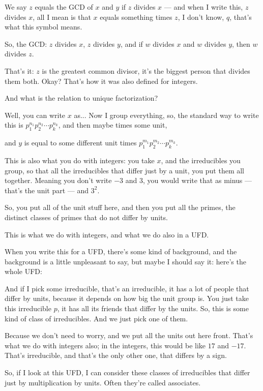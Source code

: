 \begin{speech}[01:18:14 - 01:21:04]
We say $z$ equals the GCD of $x$ and $y$ if $z$ divides $x$ --- and when I write this, $z$ divides $x$, all I mean is that $x$ equals something times $z$,  I don't know, $q$, that's what this symbol means.

So, the GCD: $z$ divides $x$, $z$ divides $y$,  and if $w$ divides $x$ and $w$ divides $y$, then $w$ divides $z$. 

That's it: $z$ is the greatest common divisor, it's the biggest person that divides them both. Okay? That's how it was also defined for integers.

And what is the relation to unique factorization?

Well, you can write $x$ as...  Now I group everything, so, the standard way to write this is $p_1^{n_1} p_2^{n_2} \cdots p_k^{n_k}$, and then maybe times some unit, 

and $y$ is equal to some different unit times $p_1^{m_1} p_2^{m_2} \cdots p_k^{m_k}$. 

This is also what you do with integers: you take $x$, and the irreducibles you group, so that all the irreducibles that differ just by a unit, you put them all together. Meaning you don't write $-3$ and $3$, you would write that as minus --- that's the unit part --- and $3^2$. 

So, you put all of the unit stuff here, and then you put all the primes, the distinct classes of primes that do not differ by units.

This is what we do with integers, and what we do also in a UFD.

When you write this for a UFD, there's some kind of background, and the background is a little unpleasant to say, but maybe I should say it: here's the whole UFD: 

And if I pick some irreducible,  that's an irreducible, it has a lot of people that differ by units, because it depends on how big the unit group is.  You just take this irreducible $p$, it has all its friends that differ by the units. So, this is some kind of class of irreducibles. And we just pick one of them.

Because we don't need to worry, and we put all the units out here front. That's what we do with integers also; in the integers, this would be like $17$ and $-17$.  That's irreducible, and that's the only other one, that differs by a sign.

So, if I look at this UFD, I can consider these classes of irreducibles that differ just by multiplication by units. Often they're called associates.
\end{speech}

